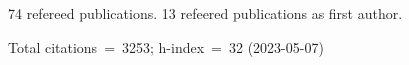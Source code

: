 74 refereed publications. 13 refeered publications as first author.

Total citations~=~3253; h-index~=~32 (2023-05-07)